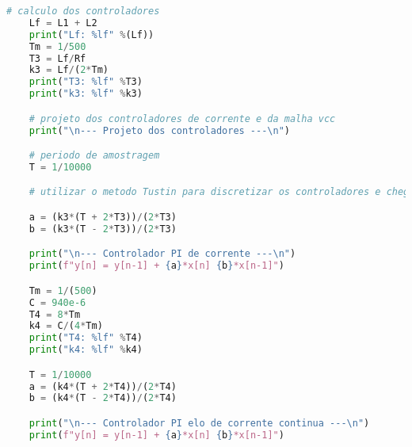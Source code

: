\begin{anexosenv}
\begin{lstlisting}[language=Python,caption=Projeto do filtro LCL e controladores]
    # calculo dos controladores
    Lf = L1 + L2
    print("Lf: %lf" %(Lf))
    Tm = 1/500
    T3 = Lf/Rf
    k3 = Lf/(2*Tm)
    print("T3: %lf" %T3)
    print("k3: %lf" %k3)

    # projeto dos controladores de corrente e da malha vcc
    print("\n--- Projeto dos controladores ---\n")

    # periodo de amostragem
    T = 1/10000

    # utilizar o metodo Tustin para discretizar os controladores e chegar nas equacoes analiticas abaixo

    a = (k3*(T + 2*T3))/(2*T3)
    b = (k3*(T - 2*T3))/(2*T3)

    print("\n--- Controlador PI de corrente ---\n")
    print(f"y[n] = y[n-1] + {a}*x[n] {b}*x[n-1]")

    Tm = 1/(500)
    C = 940e-6
    T4 = 8*Tm
    k4 = C/(4*Tm)
    print("T4: %lf" %T4)
    print("k4: %lf" %k4)

    T = 1/10000
    a = (k4*(T + 2*T4))/(2*T4)
    b = (k4*(T - 2*T4))/(2*T4)

    print("\n--- Controlador PI elo de corrente continua ---\n")
    print(f"y[n] = y[n-1] + {a}*x[n] {b}*x[n-1]")

\end{lstlisting}

\end{anexosenv}

